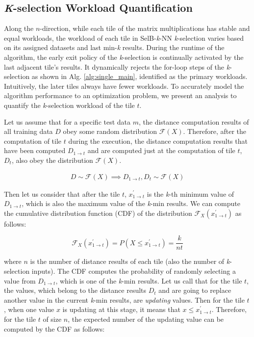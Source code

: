 \subsection{\textit{K}-selection Workload Quantification \label{kSel}}

Along the $n$-direction, while each tile of the matrix multiplications has stable and equal workloads, the workload of each tile in SelB-\textit{k}-NN \textit{k}-selection varies based on its assigned datasets and last min-\textit{k} results. During the runtime of the algorithm, the early exit policy of the \textit{k}-selection is continually activated by the last adjacent tile's results. It dynamically rejects the for-loop steps of the \textit{k}-selection as shown in Alg. \ref{alg:single_main}, identified as the primary workloads. Intuitively, the later tiles always have fewer workloads. To accurately model the algorithm performance to an optimization problem, we present an analysis to quantify the \textit{k}-selection workload of the tile $t$.

Let us assume that for a specific test data $m$, the distance computation results of all training data $D$ obey some random distribution $\mathcal{F}(X)$. Therefore, after the computation of tile $t$ during the execution, the distance computation results that have been computed $D_{1 \to t}$ and are computed just at the computation of tile $t$, $D_{t}$, also obey the distribution $\mathcal{F}(X)$.

\begin{equation}
    \begin{aligned}
        D \sim \mathcal{F}(X) \implies D_{1 \to t}, D_{t} \sim \mathcal{F}(X)  
    \end{aligned}
\end{equation}


Then let us consider that after the tile $t$, $x^{\prime}_{1 \to t}$ is the \textit{k}-th minimum value of $D_{1 \to t}$, which is also the maximum value of the \textit{k}-min results. We can compute the cumulative distribution function (CDF) of the distribution $\mathcal{F}_{X}(x^{\prime}_{1 \to t})$ as follows:

\begin{equation}
    \mathcal{F}_{X}(x^{\prime}_{1 \to t}) = P(X \le x^{\prime}_{1 \to t}) = \frac{k}{nt}
\end{equation}

where $n$ is the number of distance results of each tile (also the number of \textit{k}-selection inputs). The CDF computes the probability of randomly selecting a value from $D_{1 \to t}$, which is one of the \textit{k}-min results. Let us call that for the tile $t$, the values, which belong to the distance results $D_{t}$ and are going to replace another value in the current \textit{k}-min results, are \textit{updating} values. Then for the tile $t$, when one value $x$ is updating at this stage, it means that $x \le x^{\prime}_{1 \to t}$. Therefore, for the tile $t$ of size $n$, the expected number of the updating value can be computed by the CDF as follows:

